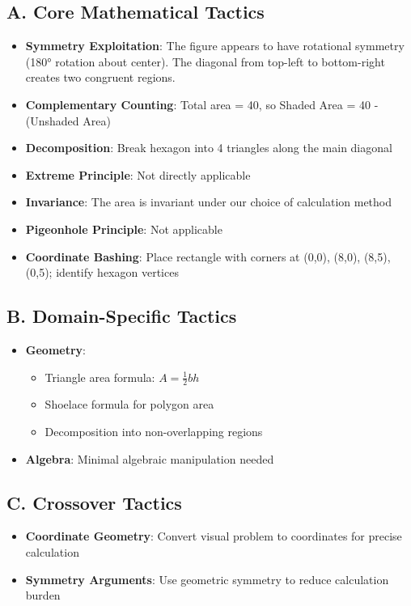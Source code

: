 \documentclass[11pt]{article}
\begin{document}
\begin{tacticalbox}
\subsection*{A. Core Mathematical Tactics}
\begin{itemize}[leftmargin=*]
    \item \textbf{Symmetry Exploitation}: The figure appears to have rotational symmetry (180° rotation about center). The diagonal from top-left to bottom-right creates two congruent regions.
    \item \textbf{Complementary Counting}: Total area = 40, so Shaded Area = 40 - (Unshaded Area)
    \item \textbf{Decomposition}: Break hexagon into 4 triangles along the main diagonal
    \item \textbf{Extreme Principle}: Not directly applicable
    \item \textbf{Invariance}: The area is invariant under our choice of calculation method
    \item \textbf{Pigeonhole Principle}: Not applicable
    \item \textbf{Coordinate Bashing}: Place rectangle with corners at (0,0), (8,0), (8,5), (0,5); identify hexagon vertices
\end{itemize}

\subsection*{B. Domain-Specific Tactics}
\begin{itemize}[leftmargin=*]
    \item \textbf{Geometry}:
        \begin{itemize}
            \item Triangle area formula: $A = \frac{1}{2}bh$
            \item Shoelace formula for polygon area
            \item Decomposition into non-overlapping regions
        \end{itemize}
    \item \textbf{Algebra}: Minimal algebraic manipulation needed
\end{itemize}

\subsection*{C. Crossover Tactics}
\begin{itemize}[leftmargin=*]
    \item \textbf{Coordinate Geometry}: Convert visual problem to coordinates for precise calculation
    \item \textbf{Symmetry Arguments}: Use geometric symmetry to reduce calculation burden
\end{itemize}
\end{tacticalbox}
\end{document}
